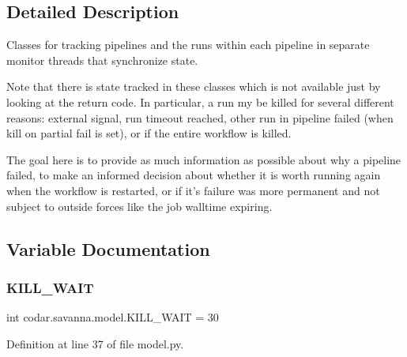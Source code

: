 \subsection{Detailed Description}
\begin{DoxyVerb}Classes for tracking pipelines and the runs within each pipeline in separate
monitor threads that synchronize state.

Note that there is state tracked in these classes which is not available just
by looking at the return code. In particular, a run my be killed for several
different reasons: external signal, run timeout reached, other run in pipeline
failed (when kill on partial fail is set), or if the entire workflow is killed.

The goal here is to provide as much information as possible about why a
pipeline failed, to make an informed decision about whether it is worth
running again when the workflow is restarted, or if it's failure was more
permanent and not subject to outside forces like the job walltime expiring.
\end{DoxyVerb}
 

\subsection{Variable Documentation}
\mbox{\label{namespacecodar_1_1savanna_1_1model_a5c2add528fd0ef347e5ff8deb12e9ada}} 
\subsubsection{\texorpdfstring{K\+I\+L\+L\+\_\+\+W\+A\+IT}{KILL\_WAIT}}
{\footnotesize\ttfamily int codar.\+savanna.\+model.\+K\+I\+L\+L\+\_\+\+W\+A\+IT = 30}



Definition at line 37 of file model.\+py.

\mbox{\label{namespacecodar_1_1savanna_1_1model_a375dfbe6e7e59d827254d61f41c881f7}} 
